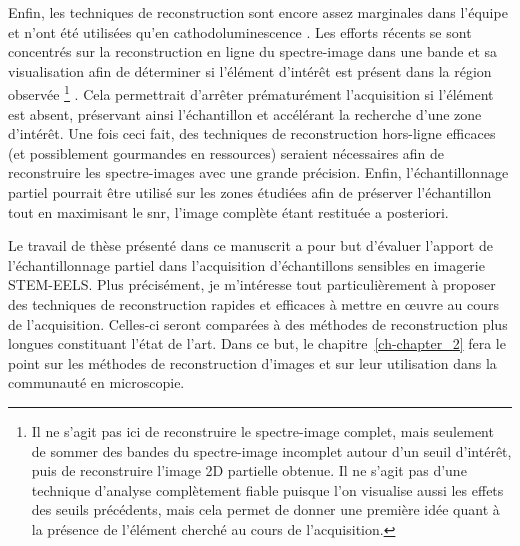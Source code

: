     Enfin, les techniques de reconstruction sont encore assez marginales dans l'équipe et n'ont été utilisées qu'en cathodoluminescence \cite{zobelli2019spatial}. 
    Les efforts récents se sont concentrés sur la reconstruction en ligne du spectre-image dans une bande et sa visualisation afin de déterminer si l'élément d'intérêt est présent dans la région observée%
    \footnote{%
    Il ne s'agit pas ici de reconstruire le spectre-image complet, mais seulement de sommer des bandes du spectre-image incomplet autour d'un seuil d'intérêt, puis de reconstruire l'image 2D partielle obtenue. Il ne s'agit pas d'une technique d'analyse complètement fiable puisque l'on visualise aussi les effets des seuils précédents, mais cela permet de donner une première idée quant à la présence de l'élément cherché au cours de l'acquisition.}%
    . 
    Cela permettrait d'arrêter prématurément l'acquisition si l'élément est absent, préservant ainsi l'échantillon et accélérant la recherche d'une zone d'intérêt. 
    Une fois ceci fait, des techniques de reconstruction hors-ligne efficaces (et possiblement gourmandes en ressources) seraient nécessaires afin de reconstruire les spectre-images avec une grande précision. Enfin, l'échantillonnage partiel pourrait être utilisé sur les zones étudiées afin de préserver l'échantillon tout en maximisant le \gls{snr}, l'image complète étant restituée a posteriori.
    
    Le travail de thèse présenté dans ce manuscrit a pour but d'évaluer l'apport de l'échantillonnage partiel dans l'acquisition d'échantillons sensibles en imagerie STEM-EELS. Plus précisément, je m'intéresse tout particulièrement à proposer des techniques de reconstruction rapides et efficaces à mettre en \oe{}uvre au cours de l'acquisition. Celles-ci seront comparées à des méthodes de reconstruction plus longues constituant l'état de l'art. Dans ce but, le chapitre~\ref{ch-chapter_2} fera le point sur les méthodes de reconstruction d'images et sur leur utilisation dans la communauté en microscopie.
    
    
    
    
    
    


